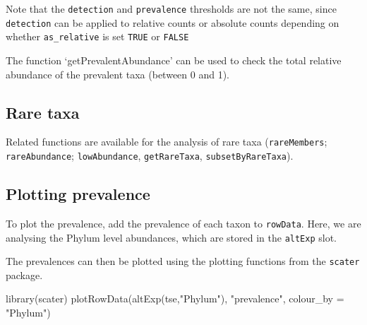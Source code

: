 \documentclass[
]{book}
\newenvironment{Shaded}{\begin{snugshade}}{\end{snugshade}}
\newcommand{\AttributeTok}[1]{\textcolor[rgb]{0.77,0.63,0.00}{#1}}
\newcommand{\ConstantTok}[1]{\textcolor[rgb]{0.00,0.00,0.00}{#1}}
\newcommand{\DecValTok}[1]{\textcolor[rgb]{0.00,0.00,0.81}{#1}}
\newcommand{\FunctionTok}[1]{\textcolor[rgb]{0.00,0.00,0.00}{#1}}
\newcommand{\NormalTok}[1]{#1}
\newcommand{\OtherTok}[1]{\textcolor[rgb]{0.56,0.35,0.01}{#1}}
\newcommand{\SpecialCharTok}[1]{\textcolor[rgb]{0.00,0.00,0.00}{#1}}
\newcommand{\StringTok}[1]{\textcolor[rgb]{0.31,0.60,0.02}{#1}}
\begin{document}
Note that the \texttt{detection} and \texttt{prevalence} thresholds are not the same, since
\texttt{detection} can be applied to relative counts or absolute counts depending on
whether \texttt{as\_relative} is set \texttt{TRUE} or \texttt{FALSE}

The function `getPrevalentAbundance' can be used to check the total
relative abundance of the prevalent taxa (between 0 and 1).

\hypertarget{rare-taxa}{%
\subsection{Rare taxa}\label{rare-taxa}}

Related functions are available for the analysis of rare taxa
(\texttt{rareMembers}; \texttt{rareAbundance}; \texttt{lowAbundance}, \texttt{getRareTaxa},
\texttt{subsetByRareTaxa}).

\hypertarget{plotting-prevalence}{%
\subsection{Plotting prevalence}\label{plotting-prevalence}}

To plot the prevalence, add the prevalence of each taxon to
\texttt{rowData}. Here, we are analysing the Phylum level abundances, which
are stored in the \texttt{altExp} slot.

\begin{Shaded}
\end{Shaded}

The prevalences can then be plotted using the plotting functions from
the \texttt{scater} package.

\begin{Shaded}
\begin{Highlighting}[]
\FunctionTok{library}\NormalTok{(scater)}
\FunctionTok{plotRowData}\NormalTok{(}\FunctionTok{altExp}\NormalTok{(tse,}\StringTok{"Phylum"}\NormalTok{), }\StringTok{"prevalence"}\NormalTok{, }\AttributeTok{colour\_by =} \StringTok{"Phylum"}\NormalTok{)}
\end{Highlighting}
\end{Shaded}
\end{document}
